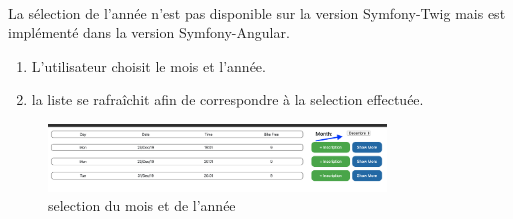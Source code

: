 \paragraph{}
	La sélection de l'année n'est pas disponible sur la version Symfony-Twig mais est implémenté dans la version Symfony-Angular. 

\vspace{\baselineskip}
\begin{enumerate}
	\item L'utilisateur choisit le mois et l'année. 
	\item la liste se rafraîchit afin de correspondre à la selection effectuée. 
\end{enumerate}

\begin{figure}[h]
	\includegraphics[width = 0.8\textwidth,center]{Figures/us2-1}
	\caption{selection du mois et de l'année}
\end{figure}

